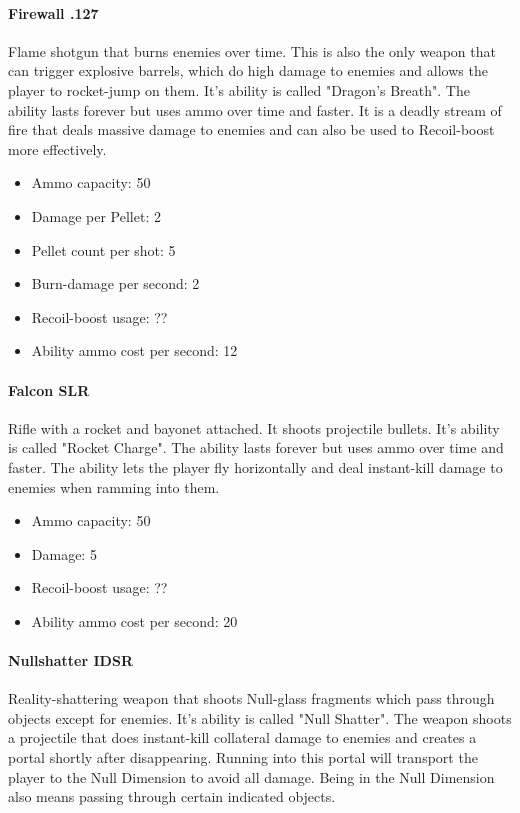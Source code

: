 \documentclass[12pt]{article}
\begin{document}
\paragraph{Firewall .127}

Flame shotgun that burns enemies over time. This is also the only weapon that can trigger explosive barrels, which do high damage to enemies and allows the player to rocket-jump on them. It's ability is called "Dragon's Breath". The ability lasts forever but uses ammo over time and faster. It is a deadly stream of fire that deals massive damage to enemies and can also be used to Recoil-boost more effectively.

\begin{itemize}
	\item Ammo capacity: 50
	\item Damage per Pellet: 2
	\item Pellet count per shot: 5
	\item Burn-damage per second: 2
	\item Recoil-boost usage: ??
	\item Ability ammo cost per second: 12
\end{itemize} 

\paragraph{Falcon SLR}

Rifle with a rocket and bayonet attached. It shoots projectile bullets. It's ability is called "Rocket Charge". The ability lasts forever but uses ammo over time and faster. The ability lets the player fly horizontally and deal instant-kill damage to enemies when ramming into them.

\begin{itemize}
	\item Ammo capacity: 50
	\item Damage: 5
	\item Recoil-boost usage: ??
	\item Ability ammo cost per second: 20
\end{itemize} 


\paragraph{Nullshatter IDSR}

Reality-shattering weapon that shoots Null-glass fragments which pass through objects except for enemies. It's ability is called "Null Shatter". The weapon shoots a projectile that does instant-kill collateral damage to enemies and creates a portal shortly after disappearing. Running into this portal will transport the player to the Null Dimension to avoid all damage. Being in the Null Dimension also means passing through certain indicated objects. 
\end{document}

